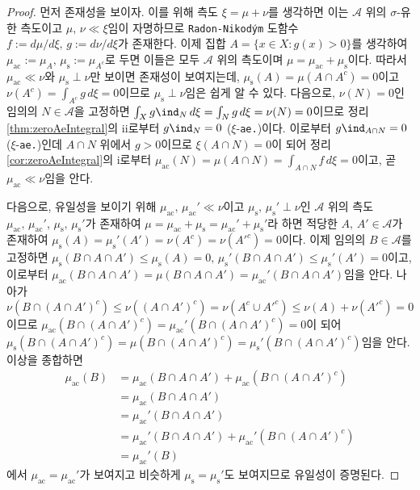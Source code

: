 \begin{proof}
    먼저 존재성을 보이자. 이를 위해 측도 $\xi=\mu+\nu$를 생각하면 이는 $\mathcal{A}$ 위의 $\sigma$-유한 측도이고 $\mu,\,\nu\ll\xi$임이 자명하므로 \texttt{Radon-Nikod\'ym} 도함수 $f:=d\mu/d\xi,\,g:=d\nu/d\xi$가 존재한다. 이제 집합 $A=\{x\in X:g(x)>0\}$를 생각하여 $\mu_\mathrm{ac}:=\mu_A,\,\mu_\mathrm{s}:=\mu_{A^c}$로 두면 이들은 모두 $\mathcal{A}$ 위의 측도이며 $\mu=\mu_\mathrm{ac}+\mu_\mathrm{s}$이다. 따라서 $\mu_\mathrm{ac}\ll\nu$와 $\mu_\mathrm{s}\perp\nu$만 보이면 존재성이 보여지는데, $\mu_\mathrm{s}(A)=\mu(A\cap A^c)=0$이고 $\nu(A^c)=\int_{A^c}g\,d\xi=0$이므로 $\mu_\mathrm{s}\perp\nu$임은 쉽게 알 수 있다. 다음으로, $\nu(N)=0$인 임의의 $N\in\mathcal{A}$을 고정하면 $\int_Xg\ind_N\,d\xi=\int_Ng\,d\xi=\nu(N)=0$이므로 정리 \ref{thm:zeroAeIntegral}의 ii로부터 $g\ind_N=0$ ($\xi$-\texttt{ae.})이다. 이로부터 $g\ind_{A\cap N}=0$ ($\xi$-\texttt{ae.})인데 $A\cap N$ 위에서 $g>0$이므로 $\xi(A\cap N)=0$이 되어 정리 \ref{cor:zeroAeIntegral}의 i로부터 $\mu_\mathrm{ac}(N)=\mu(A\cap N)=\int_{A\cap N}f\,d\xi=0$이고, 곧 $\mu_\mathrm{ac}\ll\nu$임을 안다.

    다음으로, 유일성을 보이기 위해 $\mu_\mathrm{ac},\,\mu_\mathrm{ac}'\ll\nu$이고 $\mu_\mathrm{s},\,\mu_\mathrm{s}'\perp\nu$인 $\mathcal{A}$ 위의 측도 $\mu_\mathrm{ac},\,\mu_\mathrm{ac}'$, $\mu_\mathrm{s},\,\mu_\mathrm{s}'$가 존재하여 $\mu=\mu_\mathrm{ac}+\mu_\mathrm{s}=\mu_\mathrm{ac}'+\mu_\mathrm{s}'$라 하면 적당한 $A,\,A'\in\mathcal{A}$가 존재하여 $\mu_\mathrm{s}(A)=\mu_\mathrm{s}'(A')=\nu(A^c)=\nu(A'^c)=0$이다. 이제 임의의 $B\in\mathcal{A}$를 고정하면 $\mu_\mathrm{s}(B\cap A\cap A')\leq\mu_\mathrm{s}(A)=0,\,\mu_\mathrm{s}'(B\cap A\cap A')\leq\mu_\mathrm{s}'(A')=0$이고, 이로부터 $\mu_\mathrm{ac}(B\cap A\cap A')=\mu(B\cap A\cap A')=\mu_\mathrm{ac}'(B\cap A\cap A')$임을 안다. 나아가 $\nu(B\cap(A\cap A')^c)\leq\nu((A\cap A')^c)=\nu(A^c\cup A'^c)\leq\nu(A)+\nu(A'^c)=0$이므로 $\mu_\mathrm{ac}(B\cap(A\cap A')^c)=\mu_\mathrm{ac}'(B\cap(A\cap A')^c)=0$이 되어 $\mu_\mathrm{s}(B\cap(A\cap A')^c)=\mu(B\cap(A\cap A')^c)=\mu_\mathrm{s}'(B\cap(A\cap A')^c)$임을 안다. 이상을 종합하면
    \begin{align*}
        \mu_\mathrm{ac}(B)&=\mu_\mathrm{ac}(B\cap A\cap A')+\mu_\mathrm{ac}(B\cap(A\cap A')^c)\\
        &=\mu_\mathrm{ac}(B\cap A\cap A')\\
        &=\mu_\mathrm{ac}'(B\cap A\cap A')\\
        &=\mu_\mathrm{ac}'(B\cap A\cap A')+\mu_\mathrm{ac}'(B\cap(A\cap A')^c)\\
        &=\mu_\mathrm{ac}'(B)
    \end{align*}
    에서 $\mu_\mathrm{ac}=\mu_\mathrm{ac}'$가 보여지고 비슷하게 $\mu_\mathrm{s}=\mu_\mathrm{s}'$도 보여지므로 유일성이 증명된다.
\end{proof}

